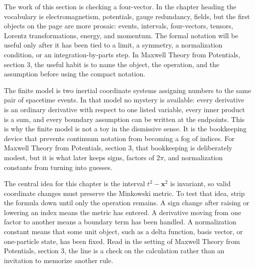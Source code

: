 











The work of this section is checking a four-vector.  In the chapter heading the vocabulary is electromagnetism, potentials, gauge redundancy, fields, but the first objects on the page are more prosaic: events, intervals, four-vectors, tensors, Lorentz transformations, energy, and momentum.  The formal notation will be useful only after it has been tied to a limit, a symmetry, a normalization condition, or an integration-by-parts step.  In Maxwell Theory from Potentials, section 3, the useful habit is to name the object, the operation, and the assumption before using the compact notation.

The finite model is two inertial coordinate systems assigning numbers to the same pair of spacetime events.  In that model no mystery is available: every derivative is an ordinary derivative with respect to one listed variable, every inner product is a sum, and every boundary assumption can be written at the endpoints.  This is why the finite model is not a toy in the dismissive sense.  It is the bookkeeping device that prevents continuum notation from becoming a fog of indices.  For Maxwell Theory from Potentials, section 3, that bookkeeping is deliberately modest, but it is what later keeps signs, factors of \(2\pi\), and normalization constants from turning into guesses.

The central idea for this chapter is the interval \(t^2-\bm x^2\) is invariant, so valid coordinate changes must preserve the Minkowski metric.  To test that idea, strip the formula down until only the operation remains.  A sign change after raising or lowering an index means the metric has entered.  A derivative moving from one factor to another means a boundary term has been handled.  A normalization constant means that some unit object, such as a delta function, basis vector, or one-particle state, has been fixed.  Read in the setting of Maxwell Theory from Potentials, section 3, the line is a check on the calculation rather than an invitation to memorize another rule.

